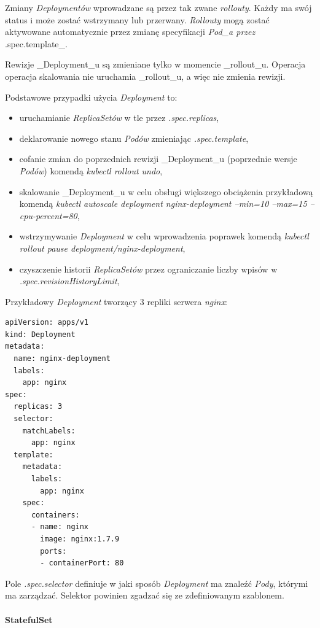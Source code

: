 \documentclass[a4paper,12pt,twoside,openany]{report}
\providecommand{\tightlist}{%
  \setlength{\itemsep}{0pt}\setlength{\parskip}{0pt}}
\begin{document}
Zmiany \emph{Deploymentów} wprowadzane są przez tak zwane
\emph{rollouty}. Każdy ma swój status i może zostać wstrzymany lub
przerwany. \emph{Rollouty} mogą zostać aktywowane automatycznie przez
zmianę specyfikacji \emph{Pod\_a przez }.spec.template\_.

Rewizje \_Deployment\_u są zmieniane tylko w momencie \_rollout\_u.
Operacja operacja skalowania nie uruchamia \_rollout\_u, a więc nie
zmienia rewizji.

Podstawowe przypadki użycia \emph{Deployment} to:

\begin{itemize}
\tightlist
\item
  uruchamianie \emph{ReplicaSetów} w tle przez \emph{.spec.replicas},
\item
  deklarowanie nowego stanu \emph{Podów} zmieniając
  \emph{.spec.template},
\item
  cofanie zmian do poprzednich rewizji \_Deployment\_u (poprzednie
  wersje \emph{Podów}) komendą \emph{kubectl rollout undo},
\item
  skalowanie \_Deployment\_u w celu obsługi większego obciążenia
  przykładową komendą \emph{kubectl autoscale deployment
  nginx-deployment --min=10 --max=15 --cpu-percent=80},
\item
  wstrzymywanie \emph{Deployment} w celu wprowadzenia poprawek komendą
  \emph{kubectl rollout pause deployment/nginx-deployment},
\item
  czyszczenie historii \emph{ReplicaSetów} przez ograniczanie liczby
  wpisów w \emph{.spec.revisionHistoryLimit},
\end{itemize}

Przykładowy \emph{Deployment} tworzący 3 repliki serwera \emph{nginx}:

\begin{lstlisting}
apiVersion: apps/v1
kind: Deployment
metadata:
  name: nginx-deployment
  labels:
    app: nginx
spec:
  replicas: 3
  selector:
    matchLabels:
      app: nginx
  template:
    metadata:
      labels:
        app: nginx
    spec:
      containers:
      - name: nginx
        image: nginx:1.7.9
        ports:
        - containerPort: 80
\end{lstlisting}

Pole \emph{.spec.selector} definiuje w jaki sposób \emph{Deployment} ma
znaleźć \emph{Pody}, którymi ma zarządzać. Selektor powinien zgadzać się
ze zdefiniowanym szablonem.

\hypertarget{statefulset}{%
\paragraph{StatefulSet}\label{statefulset}}
\end{document}
